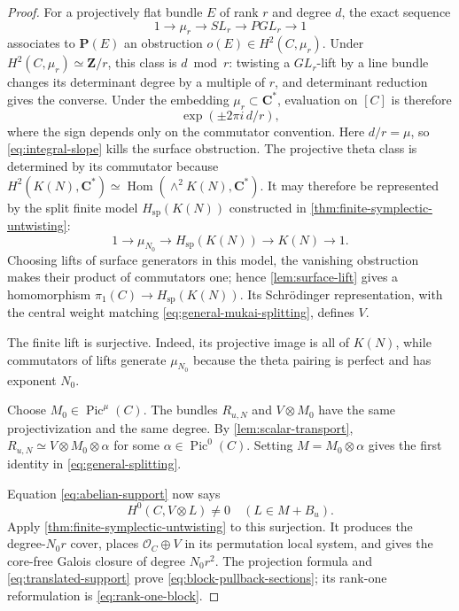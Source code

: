 \documentclass[11pt,reqno]{amsart}
\numberwithin{equation}{section}
\theoremstyle{remark}
\DeclareMathOperator{\Pic}{Pic}
\DeclareMathOperator{\Hom}{Hom}
\newcommand{\cO}{\mathcal O}
\newcommand{\bC}{\mathbf C}
\newcommand{\bZ}{\mathbf Z}
\newcommand{\bP}{\mathbf P}
\begin{document}
\begin{proof}
For a projectively flat bundle \(E\) of rank \(r\) and degree \(d\), the
exact sequence
\[
 1\longrightarrow\mu_r\longrightarrow SL_r
 \longrightarrow PGL_r\longrightarrow1
\]
associates to \(\bP(E)\) an obstruction
\(o(E)\in H^2(C,\mu_r)\).  Under
\(H^2(C,\mu_r)\simeq\bZ/r\), this class is \(d\bmod r\): twisting a
\(GL_r\)-lift by a line bundle changes its determinant degree by a
multiple of \(r\), and determinant reduction gives the converse.  Under
the embedding \(\mu_r\subset\bC^*\), evaluation on \([C]\) is therefore
\[
 \exp(\pm2\pi i\,d/r),
\tag{8.17}\label{eq:degree-obstruction}
\]
where the sign depends only on the commutator convention.  Here
\(d/r=\mu\), so \eqref{eq:integral-slope} kills the surface obstruction.
The projective theta class is determined by its commutator because
\(H^2(K(N),\bC^*)\simeq
\Hom(\wedge^2K(N),\bC^*)\).  It may therefore be represented by the
split finite model \(H_{\mathrm{sp}}(K(N))\) constructed in
\cref{thm:finite-symplectic-untwisting}:
\[
 1\longrightarrow\mu_{N_0}\longrightarrow H_{\mathrm{sp}}(K(N))
 \longrightarrow K(N)\longrightarrow1.
\]
Choosing lifts of surface generators in this model, the vanishing
obstruction makes their product of commutators one; hence
\cref{lem:surface-lift} gives a homomorphism
\(\pi_1(C)\to H_{\mathrm{sp}}(K(N))\).  Its Schr\"odinger representation, with the
central weight matching \eqref{eq:general-mukai-splitting}, defines
\(V\).

The finite lift is surjective.  Indeed, its projective image is all of
\(K(N)\), while commutators of lifts generate \(\mu_{N_0}\) because the
theta pairing is perfect and has exponent \(N_0\).

Choose \(M_0\in\Pic^\mu(C)\).  The bundles \(R_{u,N}\) and
\(V\otimes M_0\) have the same projectivization and the same degree.
By \cref{lem:scalar-transport},
\(R_{u,N}\simeq V\otimes M_0\otimes\alpha\) for some
\(\alpha\in\Pic^0(C)\).  Setting \(M=M_0\otimes\alpha\) gives the first
identity in \eqref{eq:general-splitting}.

Equation \eqref{eq:abelian-support} now says
\[
 H^0(C,V\otimes L)\neq0
\quad(L\in M+B_u).
\tag{8.18}\label{eq:translated-support}
\]
Apply \cref{thm:finite-symplectic-untwisting} to this surjection.  It
produces the degree-\(N_0r\) cover, places
\(\cO_C\oplus V\) in its permutation local system, and gives the
core-free Galois closure of degree \(N_0r^2\).  The projection formula
and \eqref{eq:translated-support} prove
\eqref{eq:block-pullback-sections}; its rank-one reformulation is
\eqref{eq:rank-one-block}.
\end{proof}
\end{document}
